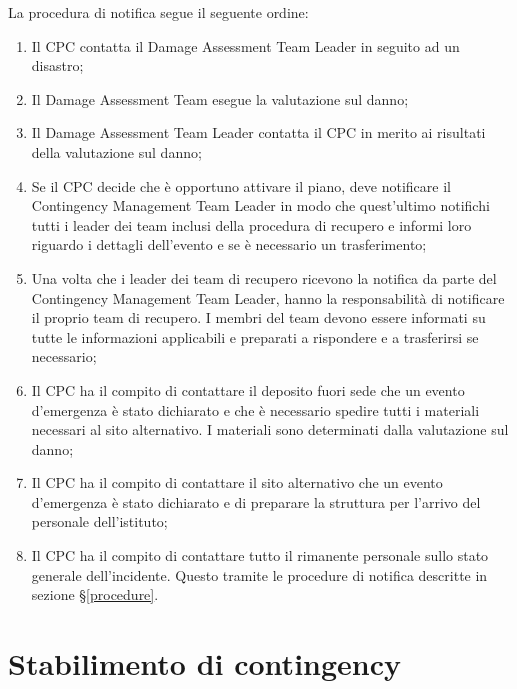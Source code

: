 \documentclass[12pt, a4paper, titlepage]{report}
\begin{document}
	La procedura di notifica segue il seguente ordine:
	\begin{enumerate}
		\item Il CPC contatta il Damage Assessment Team Leader in seguito ad un disastro;
		\item Il Damage Assessment Team esegue la valutazione sul danno;
		\item Il Damage Assessment Team Leader contatta il CPC in merito ai risultati della valutazione sul danno;
		\item Se il CPC decide che è opportuno attivare il piano, deve notificare il Contingency Management Team Leader in modo che quest'ultimo notifichi tutti i leader dei team inclusi della procedura di recupero e informi loro riguardo i dettagli dell'evento e se è necessario un trasferimento;
		\item Una volta che i leader dei team di recupero ricevono la notifica da parte del Contingency Management Team Leader, hanno la responsabilità di notificare il proprio team di recupero. I membri del team devono essere informati su tutte le informazioni applicabili e preparati a rispondere e a trasferirsi se necessario;
		\item Il CPC ha il compito di contattare il deposito fuori sede che un evento d'emergenza è stato dichiarato e che è necessario spedire tutti i materiali necessari al sito alternativo. I materiali sono determinati dalla valutazione sul danno;
		\item Il CPC ha il compito di contattare il sito alternativo che un evento d'emergenza è stato dichiarato e di preparare la struttura per l'arrivo del personale dell'istituto;
		\item Il CPC ha il compito di contattare tutto il rimanente personale sullo stato generale dell'incidente. Questo tramite le procedure di notifica descritte in sezione §\ref{procedure}.
	\end{enumerate}
	
	\newpage
	
	\section{Stabilimento di contingency}
	
\end{document}
